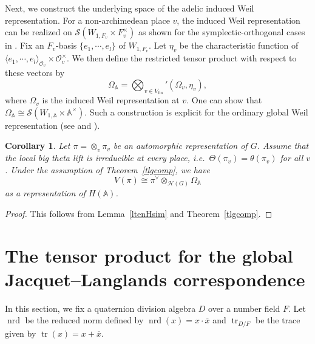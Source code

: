 \documentclass[11pt]{article}
\theoremstyle{plain}
\newtheorem{corollary}[theorem]{Corollary}
\theoremstyle{remark}
\theoremstyle{definition}
\DeclareMathOperator{\tr}{tr}
\DeclareMathOperator{\nrd}{nrd}
\DeclareMathOperator{\fin}{fin}
\begin{document}
Next, we construct the underlying space of the adelic induced Weil representation.
For a non-archimedean place $v$, the induced Weil representation can be realized on $\mathcal{S}(W_{1,F_v}\times F_v^{\times})$ as shown for the symplectic-orthogonal cases in \cite[Section 3]{RobertBrooks1996}.
Fix an $F_v$-basis $\{e_1,\cdots,e_l\}$ of $W_{1,F_v}$.
Let $\eta_v$ be the characteristic function of $\langle e_1,\cdots,e_l\rangle_{\mathcal{O}_v}\times \mathcal{O}_v^{\times}$.
We then define the restricted tensor product with respect to these vectors by
\begin{equation}\label{eglobalOmega}
    \Omega_{\mathbb{A}}=\bigotimes_{v\in V_{\fin}}{}'(\Omega_v,\eta_v),
\end{equation}
where $\Omega_v$ is the induced Weil representation at $v$.
One can show that $\Omega_{\mathbb{A}}\cong \mathcal{S}(W_{1,\mathbb{A}}\times \mathbb{A}^{\times})$.
Such a construction is explicit for the ordinary global Weil representation (see \cite[\S 6]{GMS2024} and \cite[\S 8]{PrasadD1993}).

\begin{corollary}\label{cgtenHsim}
Let $\pi=\otimes_v\pi_v$ be an automorphic representation of $G$.
Assume that the local big theta lift is irreducible at every place, i.e.\ $\Theta(\pi_v)=\theta(\pi_v)$ for all $v$.
Under the assumption of Theorem~\ref{tlgcomp}, we have
\[
V(\pi)\cong \pi^{\vee}\otimes_{\mathcal{H}(G)}\Omega_{\mathbb{A}}
\]
as a representation of $H(\mathbb{A})$.
\end{corollary}

\begin{proof}
This follows from Lemma~\ref{ltenHsim} and Theorem~\ref{tlgcomp}.
\end{proof}

\section{The tensor product for the global Jacquet--Langlands correspondence}\label{stenJL}

In this section, we fix a quaternion division algebra $D$ over a number field $F$.
Let $\nrd$ be the reduced norm defined by $\nrd(x)=x\cdot \overline{x}$ and $\tr_{D/F}$ be the trace given by $\tr(x)=x+\overline{x}$.
\end{document}
